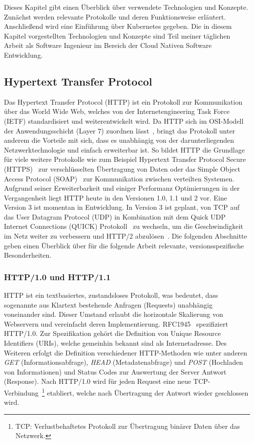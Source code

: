 Dieses Kapitel gibt einen Überblick über verwendete Technologien und Konzepte.
Zunächst werden relevante Protokolle und deren Funktionsweise erläutert.
Anschließend wird eine Einführung über Kubernetes gegeben.
Die in diesem Kapitel vorgestellten Technologien und Konzepte sind Teil meiner täglichen Arbeit als Software Ingenieur im Bereich der Cloud Nativen Software Entwicklung.

\subsection{Hypertext Transfer Protocol}\label{subsec:hyper-text-transfer-protocol}

Das Hypertext Transfer Protocol (HTTP) ist ein Protokoll zur Kommunikation über das World Wide Web, welches von der Internetengineering Task Force (IETF) standardisiert und weiterentwickelt wird.
Da HTTP sich im OSI-Modell der Anwendungsschicht (Layer 7) zuordnen lässt~\cite{kumar2014osi}, bringt das Protokoll unter anderem die Vorteile mit sich, dass es unabhängig von der darunterliegenden Netzwerktechnologie und einfach erweiterbar ist.
So bildet HTTP die Grundlage für viele weitere Protokolle wie zum Beispiel Hypertext Transfer Protocol Secure (HTTPS)~\cite{rfc2818} zur verschlüsselten Übertragung von Daten oder das Simple Object Access Protocol (SOAP)~\cite{SOAP-20000508} zur Kommunikation zwischen verteilten Systemen.
Aufgrund seiner Erweiterbarkeit und einiger Performanz Optimierungen in der Vergangenheit liegt HTTP heute in den Versionen 1.0, 1.1 und 2 vor.
Eine Version 3 ist momentan in Entwicklung.
In Version 3 ist geplant, von TCP auf das User Datagram Protocol (UDP) in Kombination mit dem Quick UDP Internet Connections (QUICK) Protokoll~\cite{rfc9000} zu wechseln, um die Geschwindigkeit im Netz weiter zu verbessern und HTTP/2 abzulösen~\cite{rfc9114}.
Die folgenden Abschnitte geben einen Überblick über für die folgende Arbeit relevante, versionsspezifische Besonderheiten.

\subsubsection{HTTP/1.0 und HTTP/1.1}
HTTP ist ein textbasiertes, zustandsloses Protokoll, was bedeutet, dass sogenannte aus Klartext bestehende Anfragen (Requests) unabhängig voneinander sind.
Dieser Umstand erlaubt die horizontale Skalierung von Webservern und vereinfacht deren Implementierung.
RFC1945~\cite{rfc1945} spezifiziert HTTP/1.0.
Zur Spezifikation gehört die Definition von Unique Resource Identifiers (URIs), welche gemeinhin bekannt sind als Internetadresse.
Des Weiteren erfolgt die Definition verschiedener HTTP-Methoden wie unter anderen \textit{GET} (Informationsabfrage), \textit{HEAD} (Metadatenabfrage) und \textit{POST} (Hochladen von Informationen) und Status Codes zur Auswertung der Server Antwort (Response).
Nach HTTP/1.0 wird für jeden Request eine neue TCP-Verbindung~\footnote{TCP: Verlustbehaftetes Protokoll zur Übertragung binärer Daten über das Netzwerk.} etabliert, welche nach Übertragung der Antwort wieder geschlossen wird.

